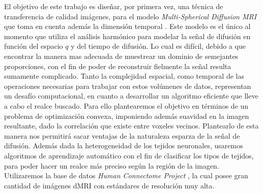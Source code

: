 \documentclass[a4paper,10pt]{article}
\begin{document}
El objetivo de este trabajo es diseñar, por primera vez, una técnica de transferencia de calidad 
imágenes, para el modelo \textit{Multi-Spherical Diffusion MRI} que toma en cuenta además la dimensión temporal 
\citep{Fick}. Este modelo es el \'unico al momento que utiliza el análisis harmónico para modelar la señal de difusión 
en función del espacio $q$ y del tiempo de difusión. Lo cual es difícil, debido a que encontrar la manera mas adecuada 
de muestrear un dominio de semejantes proporciones, con el fin de poder de reconstruir fielmente la señal resulta 
sumamente complicado.
%
Tanto la complejidad espacial, como temporal de 
las operaciones necesarias para trabajar con estos vol\'umenes de datos, representan un desafío computacional, en cuanto 
a desarrollar un algoritmo eficiente que lleve a cabo el realce buscado. Para ello plantearemos el objetivo en términos 
de un problema de optimización convexa, imponiendo además suavidad en la imagen resultante, dado la correlaci\'on que 
existe entre voxeles vecinos. Plantearlo de esta manera nos permitirá sacar ventajas de la naturaleza esparza de la 
señal de difusión. Además dada la heterogeneidad de los tejidos neuronales, usaremos algoritmos de aprendizaje 
automático con el fin de clasificar los tipos de tejidos, para poder hacer un realce más preciso según la región de la 
imagen. Utilizaremos la base de datos \textit{Human Connectome Project} \citep{Sotiropoulos2013125}, la cual posee gran 
cantidad de imágenes dMRI con estándares de 
resolución muy alta.

\clearpage


\end{document}
